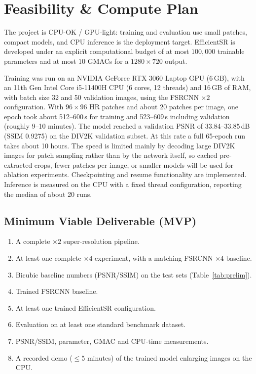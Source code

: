 \documentclass[11pt,a4paper]{article}
\begin{document}
\section{Feasibility \& Compute Plan}
\label{sec:feasibility}

The project is CPU-OK / GPU-light: training and evaluation use small
patches, compact models, and CPU inference is the deployment target.
EfficientSR is developed under an explicit computational budget of at most
$100{,}000$ trainable parameters and at most $10$ GMACs for a
$1280\times720$ output.

Training was run on an NVIDIA GeForce RTX 3060 Laptop GPU (6\,GB), with an
11th Gen Intel Core i5-11400H CPU (6 cores, 12 threads) and 16\,GB of RAM,
with batch size 32 and 50 validation images, using the FSRCNN $\times2$
configuration. With $96\times96$ HR patches and about 20 patches per image,
one epoch took about 512--600\,s for training and 523--609\,s including
validation (roughly 9--10 minutes). The model reached a validation PSNR of
33.84--33.85\,dB (SSIM 0.9275) on the DIV2K validation subset. At this rate
a full 65-epoch run takes about 10 hours. The speed is limited mainly by
decoding large DIV2K images for patch sampling rather than by the network
itself, so cached pre-extracted crops, fewer patches per image, or smaller
models will be used for ablation experiments. Checkpointing and resume
functionality are implemented. Inference is measured on the CPU with a fixed
thread configuration, reporting the median of about 20 runs.



\subsection{Minimum Viable Deliverable (MVP)}

\begin{enumerate}
    \item A complete $\times2$ super-resolution pipeline.
    \item At least one complete $\times4$ experiment, with a matching
    FSRCNN $\times4$ baseline.
    \item Bicubic baseline numbers (PSNR/SSIM) on the test sets
    (Table~\ref{tab:prelim}).
    \item Trained FSRCNN baseline.
    \item At least one trained EfficientSR configuration.
    \item Evaluation on at least one standard benchmark dataset.
    \item PSNR/SSIM, parameter, GMAC and CPU-time measurements.
    \item A recorded demo ($\le$5 minutes) of the trained model enlarging
    images on the CPU.
\end{enumerate}
\end{document}
